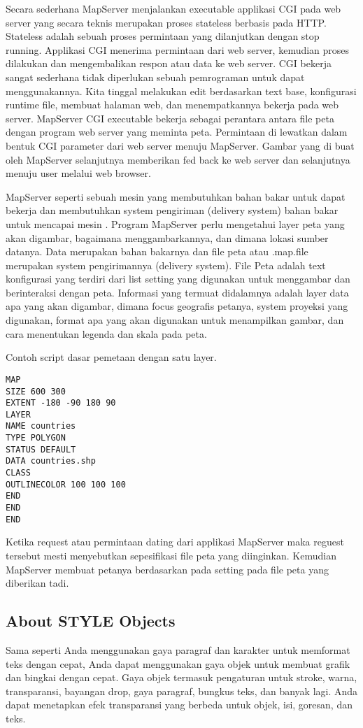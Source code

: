 Secara sederhana MapServer menjalankan executable applikasi CGI pada web server yang secara teknis merupakan 
proses stateless berbasis pada HTTP. Stateless adalah sebuah proses permintaan yang dilanjutkan dengan stop running. 
Applikasi CGI menerima permintaan dari web server, kemudian proses dilakukan dan mengembalikan respon atau data ke web server.
CGI bekerja sangat sederhana tidak diperlukan sebuah pemrograman untuk dapat menggunakannya. 
Kita tinggal melakukan edit berdasarkan text base, konfigurasi runtime file, membuat halaman web, 
dan menempatkannya bekerja pada web server. MapServer CGI executable bekerja sebagai perantara antara file peta 
dengan program web server yang meminta peta. Permintaan di lewatkan dalam bentuk CGI parameter dari web server menuju MapServer.
Gambar yang di buat oleh MapServer selanjutnya memberikan fed back ke web server dan selanjutnya menuju 
user melalui web browser.

MapServer seperti sebuah mesin yang membutuhkan bahan bakar untuk dapat bekerja dan membutuhkan system pengiriman (delivery system) bahan bakar untuk mencapai mesin . Program MapServer perlu mengetahui layer peta yang akan digambar, bagaimana menggambarkannya, dan dimana lokasi sumber datanya. Data merupakan bahan bakarnya dan file peta atau .map.file merupakan system pengirimannya (delivery system). File Peta adalah text konfigurasi yang terdiri dari list setting yang digunakan untuk menggambar dan berinteraksi dengan peta. Informasi yang termuat didalamnya adalah layer data apa yang akan digambar, dimana focus geografis petanya, system proyeksi yang digunakan, format apa yang akan digunakan untuk menampilkan gambar, dan cara menentukan legenda dan skala pada peta.

Contoh script dasar pemetaan dengan satu layer.
\begin{verbatim}
MAP
SIZE 600 300
EXTENT -180 -90 180 90
LAYER
NAME countries
TYPE POLYGON
STATUS DEFAULT
DATA countries.shp
CLASS
OUTLINECOLOR 100 100 100
END
END
END
\end{verbatim}

Ketika request atau permintaan dating dari applikasi MapServer maka reguest tersebut mesti menyebutkan sepesifikasi 
file peta yang diinginkan. Kemudian MapServer membuat petanya berdasarkan pada setting pada file peta yang diberikan tadi.

\subsection{About STYLE Objects}
Sama seperti Anda menggunakan gaya paragraf dan karakter untuk memformat teks dengan cepat, Anda dapat menggunakan gaya objek untuk membuat grafik dan bingkai dengan cepat. Gaya objek termasuk pengaturan untuk stroke, warna, transparansi, bayangan drop, gaya paragraf, bungkus teks, dan banyak lagi. Anda dapat menetapkan efek transparansi yang berbeda untuk objek, isi, goresan, dan teks.

